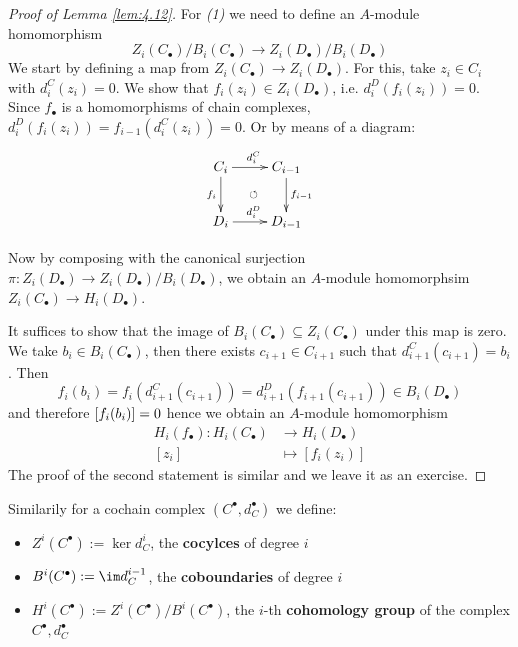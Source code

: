 \documentclass[twoside = false,	%
		headsepline,		%
		parskip = true,
		]{scrbook}						%
\begin{document}
        \begin{proof}[Proof of Lemma \ref{lem:4.12}]
            For \textit{(1)} we need to define an $A$-module homomorphism
            \begin{equation*}
                Z_i(C_\bullet)/B_i(C_\bullet) \to Z_i(D_\bullet)/B_i(D_\bullet)
            \end{equation*}
            We start by defining a map from $Z_i(C_\bullet) \to Z_i(D_\bullet)$. For this, take $z_i \in C_i$ with $d_i^C(z_i) = 0$. We show that $f_i(z_i) \in Z_i(D_\bullet)$, i.e. $d_i^D(f_i(z_i)) = 0$. Since $f_\bullet$ is a homomorphisms of chain complexes, $d_i^D(f_i(z_i)) = f_{i-1}(d_i^C(z_i)) = 0$. Or by means of a diagram:
            \begin{equation*}
            \xymatrix {
                C_i \ar[r]^{d_i^C} \ar[d]_{f_i} & C_{i-1} \ar[d]^{f_{i-1}}\\
                D_i \ar[r]^{d_{i}^D} \ar@{}[ur]|{\circlearrowleft} & D_{i-1}
            }
            \end{equation*}

            Now by composing with the canonical surjection $\pi: Z_i(D_\bullet) \to Z_i(D_\bullet)/B_i(D_\bullet)$, we obtain an $A$-module homomorphsim $Z_i(C_\bullet) \to H_i(D_\bullet)$.

            It suffices to show that the image of $B_i(C_\bullet) \subseteq Z_i(C_\bullet)$ under this map is zero. We take $b_i \in B_i(C_\bullet)$, then there exists $c_{i+1} \in C_{i+1}$ such that $d_{i+1}^C(c_{i+1}) = b_i$. Then
            \begin{equation*}
                f_i(b_i) = f_i(d_{i+1}^C(c_{i+1})) = d_{i+1}^D(f_{i+1}(c_{i+1})) \in B_i(D_\bullet)
            \end{equation*} and therefore $\left[ f_i(b_i)\right] = 0$ hence we obtain an $A$-module homomorphism
            \begin{equation*}
            \begin{split}
                H_i(f_\bullet): H_i(C_\bullet) &\to H_i(D_\bullet) \\ [z_i] &\mapsto [f_i(z_i)] 
            \end{split}
            \end{equation*}
            The proof of the second statement is similar and we leave it as an exercise. 
        \end{proof}

        Similarily for a cochain complex $(C^\bullet,d_C^\bullet)$ we define:
        \begin{itemize}
            \item $Z^i(C^\bullet):= \ker d_C^i$, the \textbf{cocylces} of degree $i$ 
            \item $B^i(C^\bullet):= \im d_C^{i-1}$, the \textbf{coboundaries} of degree $i$
            \item $H^i(C^\bullet):= Z^i(C^\bullet)/B^i(C^\bullet)$, the $i$-th \textbf{cohomology group} of the complex $C^\bullet, d_C^\bullet$
        \end{itemize}
\end{document}
